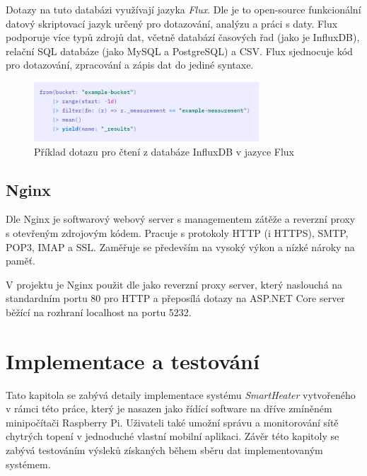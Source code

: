 Dotazy na tuto databázi využívají jazyka {\it Flux}. Dle \cite{flux} je to open-source funkcionální datový skriptovací jazyk určený pro dotazování, analýzu a práci s daty. Flux podporuje více typů zdrojů dat, včetně databází časových řad (jako je InfluxDB), relační SQL databáze (jako MySQL a PostgreSQL) a CSV. Flux sjednocuje kód pro dotazování, zpracování a zápis dat do jediné syntaxe.

\begin{figure}[hbt]
\centering
\includegraphics[width=0.75\textwidth]{obrazky-figures/flux-example.png}
\caption{Příklad dotazu pro čtení z databáze InfluxDB v jazyce Flux \cite{flux_gs}}
\end{figure}



\section{Nginx}
Dle \cite{nginx_wiki} Nginx je softwarový webový server s managementem zátěže a reverzní proxy s otevřeným zdrojovým kódem. Pracuje s protokoly HTTP (i HTTPS), SMTP, POP3, IMAP a SSL. Zaměřuje se především na vysoký výkon a nízké nároky na paměť.

V projektu je Nginx použit dle \cite{nginx_asp} jako reverzní proxy server, který naslouchá na standardním portu 80 pro HTTP a přeposílá dotazy na ASP.NET Core server běžící na rozhraní localhost na portu 5232.

\chapter{Implementace a testování}
\label{implementace}

Tato kapitola se zabývá detaily implementace systému {\it SmartHeater} vytvořeného v rámci této práce, který je nasazen jako řídící software na dříve zmíněném minipočítači Raspberry Pi. Uživateli také umožní správu a monitorování sítě chytrých topení v jednoduché vlastní mobilní aplikaci. Závěr této kapitoly se zabývá testováním výsleků získaných během sběru dat implementovaným systémem.

